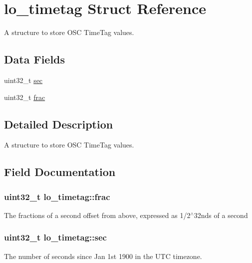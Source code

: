 \hypertarget{structlo__timetag}{\section{lo\-\_\-timetag \-Struct \-Reference}
\label{structlo__timetag}
}


\-A structure to store \-O\-S\-C \-Time\-Tag values.  


\subsection*{\-Data \-Fields}
\begin{DoxyCompactItemize}
\item 
uint32\-\_\-t \hyperlink{structlo__timetag_a917e786d87a5304c5e7ea4d3c44f7cf4}{sec}
\item 
uint32\-\_\-t \hyperlink{structlo__timetag_a1acce1a3dd765a15c47f6eb76cb96c27}{frac}
\end{DoxyCompactItemize}


\subsection{\-Detailed \-Description}
\-A structure to store \-O\-S\-C \-Time\-Tag values. 

\subsection{\-Field \-Documentation}
\hypertarget{structlo__timetag_a1acce1a3dd765a15c47f6eb76cb96c27}{
\subsubsection[{frac}]{\setlength{\rightskip}{0pt plus 5cm}uint32\-\_\-t {\bf lo\-\_\-timetag\-::frac}}}\label{structlo__timetag_a1acce1a3dd765a15c47f6eb76cb96c27}
\-The fractions of a second offset from above, expressed as 1/2$^\wedge$32nds of a second \hypertarget{structlo__timetag_a917e786d87a5304c5e7ea4d3c44f7cf4}{
\subsubsection[{sec}]{\setlength{\rightskip}{0pt plus 5cm}uint32\-\_\-t {\bf lo\-\_\-timetag\-::sec}}}\label{structlo__timetag_a917e786d87a5304c5e7ea4d3c44f7cf4}
\-The number of seconds since \-Jan 1st 1900 in the \-U\-T\-C timezone. 